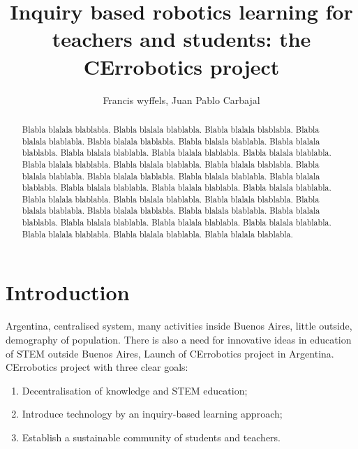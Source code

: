 \documentclass[a4paper]{llncs}
\begin{document}
\linespread{0.965}\selectfont

\mainmatter  %

\title{Inquiry based robotics learning for teachers and students: the CErrobotics project}

%
%
\author{Francis wyffels, Juan Pablo Carbajal}
%


\maketitle

\begin{abstract}
Blabla blalala blablabla. Blabla blalala blablabla. Blabla blalala blablabla. Blabla blalala blablabla. Blabla blalala blablabla. Blabla blalala blablabla. Blabla blalala blablabla. Blabla blalala blablabla. Blabla blalala blablabla. Blabla blalala blablabla. Blabla blalala blablabla. Blabla blalala blablabla. Blabla blalala blablabla. Blabla blalala blablabla. Blabla blalala blablabla. Blabla blalala blablabla. Blabla blalala blablabla. Blabla blalala blablabla. Blabla blalala blablabla. Blabla blalala blablabla. Blabla blalala blablabla. Blabla blalala blablabla. Blabla blalala blablabla. Blabla blalala blablabla. Blabla blalala blablabla. Blabla blalala blablabla. Blabla blalala blablabla. Blabla blalala blablabla. Blabla blalala blablabla. Blabla blalala blablabla. Blabla blalala blablabla. Blabla blalala blablabla. Blabla blalala blablabla.

\end{abstract}

\section{Introduction}
Argentina, centralised system, many activities inside Buenos Aires, little outside, demography of population. There is also a need for innovative ideas in education of STEM outside Buenos Aires, Launch of CErrobotics project in Argentina. CErrobotics project with three clear goals:
\begin{enumerate}
	\item Decentralisation of knowledge and STEM education;
	\item Introduce technology by an inquiry-based learning approach;
	\item Establish a sustainable community of students and teachers.
\end{enumerate}
\end{document}
